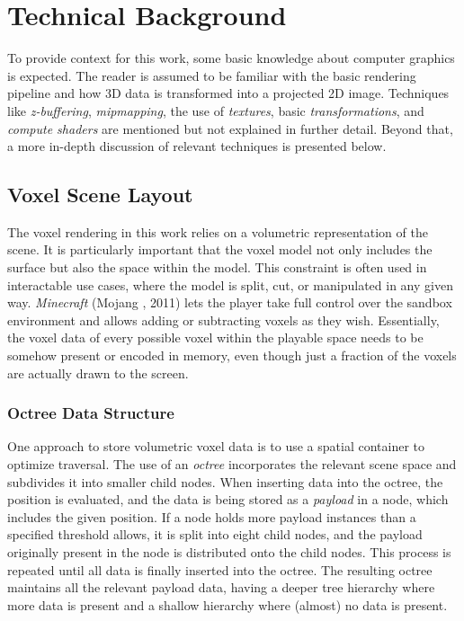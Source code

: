 \chapter{Technical Background} \label{cpt-technical-background}

To provide context for this work, some basic knowledge about computer graphics is expected.
The reader is assumed to be familiar with the basic rendering pipeline and how 3D data is 
transformed into a projected 2D image. Techniques like \emph{z-buffering}, \emph{mipmapping}, 
the use of \emph{textures}, basic \emph{transformations}, and \emph{compute shaders} are mentioned 
but not explained in further detail. Beyond that, a more in-depth discussion of relevant techniques 
is presented below.

\section{Voxel Scene Layout} \label{sec-voxel-scene-layout}

The voxel rendering in this work relies on a volumetric representation of the scene.
It is particularly important that the voxel model not only includes the surface but also 
the space within the model. This constraint is often used in interactable use cases, where 
the model is split, cut, or manipulated in any given way. \emph{Minecraft} (Mojang \cite{Mojang2024}, 
2011) lets the player take full control over the sandbox environment and allows adding or 
subtracting voxels as they wish. Essentially, the voxel data of every possible voxel within 
the playable space needs to be somehow present or encoded in memory, even though just a 
fraction of the voxels are actually drawn to the screen.


\subsection*{Octree Data Structure} \label{subsec-octree-data-structure}

One approach to store volumetric voxel data is to use a spatial container to optimize traversal. 
The use of an \emph{octree} incorporates the relevant scene space and subdivides it into smaller 
child nodes. When inserting data into the octree, the position is evaluated, and the data is 
being stored as a \emph{payload} in a node, which includes the given position. If a node holds 
more payload instances than a specified threshold allows, it is split into eight child nodes, 
and the payload originally present in the node is distributed onto the child nodes. This process 
is repeated until all data is finally inserted into the octree. The resulting octree maintains 
all the relevant payload data, having a deeper tree hierarchy where more data is present and a 
shallow hierarchy where (almost) no data is present. \\

